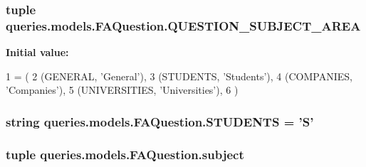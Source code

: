 \hypertarget{classqueries_1_1models_1_1_f_a_question_acbc5516bb3f9ba326f3ff1893f7d446b}{
\subsubsection[{Q\-U\-E\-S\-T\-I\-O\-N\-\_\-\-S\-U\-B\-J\-E\-C\-T\-\_\-\-A\-R\-E\-A}]{\setlength{\rightskip}{0pt plus 5cm}tuple queries.\-models.\-F\-A\-Question.\-Q\-U\-E\-S\-T\-I\-O\-N\-\_\-\-S\-U\-B\-J\-E\-C\-T\-\_\-\-A\-R\-E\-A\hspace{0.3cm}{\ttfamily [static]}}}\label{classqueries_1_1models_1_1_f_a_question_acbc5516bb3f9ba326f3ff1893f7d446b}
{\bfseries Initial value\-:}
\begin{DoxyCode}
1 = (
2         (GENERAL, \textcolor{stringliteral}{'General'}),
3         (STUDENTS, \textcolor{stringliteral}{'Students'}),
4         (COMPANIES, \textcolor{stringliteral}{'Companies'}),
5         (UNIVERSITIES, \textcolor{stringliteral}{'Universities'}),
6     )
\end{DoxyCode}
\hypertarget{classqueries_1_1models_1_1_f_a_question_a3af0be390dc5ab40ebbfd8121d89a389}{
\subsubsection[{S\-T\-U\-D\-E\-N\-T\-S}]{\setlength{\rightskip}{0pt plus 5cm}string queries.\-models.\-F\-A\-Question.\-S\-T\-U\-D\-E\-N\-T\-S = '{\bf S}'\hspace{0.3cm}{\ttfamily [static]}}}\label{classqueries_1_1models_1_1_f_a_question_a3af0be390dc5ab40ebbfd8121d89a389}
\hypertarget{classqueries_1_1models_1_1_f_a_question_a3936b3cdd958019959407233e529bea3}{
\subsubsection[{subject}]{\setlength{\rightskip}{0pt plus 5cm}tuple queries.\-models.\-F\-A\-Question.\-subject\hspace{0.3cm}{\ttfamily [static]}}}\label{classqueries_1_1models_1_1_f_a_question_a3936b3cdd958019959407233e529bea3}
